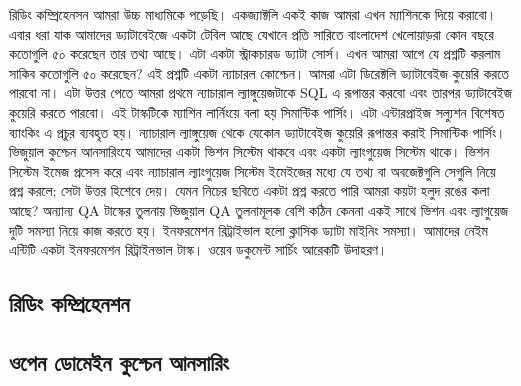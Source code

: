 রিডিং কম্প্রিহেনসন আমরা উচ্চ মাধ্যমিকে পড়েছি। একজ্যাক্টলি একই কাজ আমরা এখন ম্যাশিনকে দিয়ে করাবো। এবার ধরা যাক আমাদের ড্যাটাবেইজে একটা টেবিল আছে যেখানে প্রতি সারিতে বাংলাদেশ খেলোয়াড়রা কোন বছরে কতোগুলি ৫০ করেছেন তার তথ্য আছে। এটা একটা স্ট্রাকচারড ড্যাটা সোর্স। এখন আমরা আগে যে প্রশ্নটি করলাম সাকিব কতোগুলি ৫০ করেছেন? এই প্রশ্নটি একটা ন্যাচারল কোশ্চেন। আমরা এটা ডিরেক্টলি ড্যাটাবেইজ কুয়েরি করতে পারবো না। এটা উত্তর পেতে আমরা প্রথমে ন্যাচারাল ল্যাঙ্গুয়েজটাকে SQL এ রূপান্তর করবো এবং তারপর ড্যাটাবেইজ কুয়েরি করতে পারবো। এই টাস্কটিকে ম্যাশিন লার্নিংয়ে বলা হয় সিমান্টিক পার্সিং। এটা এন্টারপ্রাইজ সল্যুশন বিশেষত ব্যাংকিং এ প্রচুর ব্যবহৃত হয়।  ন্যাচারাল ল্যাঙ্গুয়েজ থেকে যেকোন ড্যাটাবেইজ কুয়েরি রূপান্তর করাই সিমান্টিক পার্সিং। ভিজুয়াল কুশ্চেন আনসারিংযে আমাদের একটা ভিশন সিস্টেম থাকবে এবং একটা ল্যাংগুয়েজ সিস্টেম থাকে। ভিশন সিস্টেম ইমেজ প্রসেস করে এবং ন্যাচারাল ল্যাংগুয়েজ সিস্টেম ইমেইজের মধ্যে যে তথ্য বা অবজেক্টগুলি সেগুলি নিয়ে প্রশ্ন করলে; সেটা উত্তর হিশেবে দেয়। যেমন নিচের ছবিতে একটা প্রশ্ন করতে পারি আমরা কয়টা হলুদ রঙের কলা আছে? অন্যান্য QA টাস্কের তুলনায় ভিজুয়াল QA তুলনামূলক বেশি কঠিন কেননা একই সাথে ভিশন এবং ল্যাগুয়েজ দুটি সমস্যা নিয়ে কাজ করতে হয়। ইনফরমেশন রিট্রাইভাল হলো ক্লাসিক ড্যাটা মাইনিং সমস্যা। আমাদের নেইম এন্টিটি একটা ইনফরমেশন রিট্রাইনভাল টাস্ক। ওয়েব ডকুমেন্ট সার্চিং আরেকটি উদাহরণ। 



\subsection{রিডিং কম্প্রিহেনশন}
\subsection{ওপেন ডোমেইন কুশ্চেন আনসারিং}






